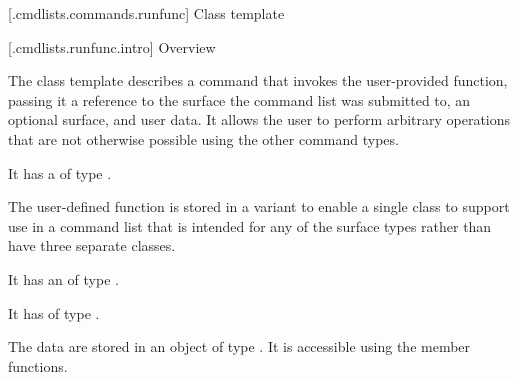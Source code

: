 
 [\iotwod.cmdlists.commands.runfunc] {Class template }

 [\iotwod.cmdlists.runfunc.intro] {Overview}

\pnum
{}%
The class template  describes a command that invokes the user-provided function, passing it a reference to the surface the command list was submitted to, an optional surface, and user data. It allows the user to perform arbitrary operations that are not otherwise possible using the other command types.

\pnum
It has a  of type .

\pnum
\begin{note}
The user-defined function is stored in a variant to enable a single class to support use in a command list that is intended for any of the surface types rather than have three separate classes.
\end{note}

\pnum
It has an  of type .

\pnum
It has  of type .

\pnum
The data are stored in an object of type . It is accessible using the  member functions.

